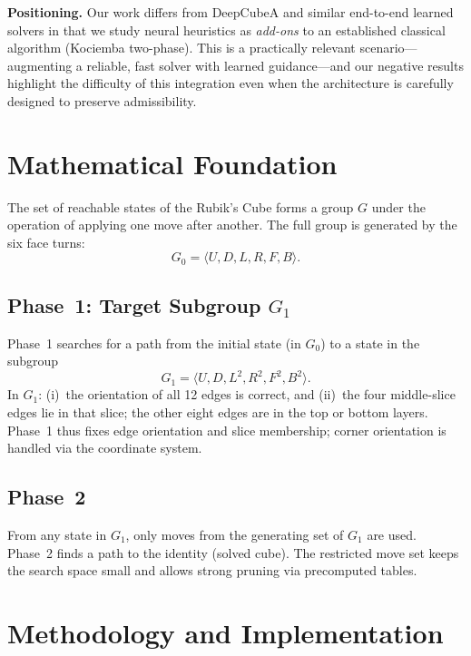 \documentclass[10pt,twocolumn,a4paper]{article}
\begin{document}
\textbf{Positioning.}
Our work differs from DeepCubeA and similar end-to-end learned solvers in that we study neural heuristics as \emph{add-ons} to an established classical algorithm (Kociemba two-phase).  This is a practically relevant scenario---augmenting a reliable, fast solver with learned guidance---and our negative results highlight the difficulty of this integration even when the architecture is carefully designed to preserve admissibility.

\section{Mathematical Foundation}
\label{sec:math}

The set of reachable states of the Rubik's Cube forms a group $G$ under the operation of applying one move after another. The full group is generated by the six face turns:
\begin{equation}
G_0 = \langle U, D, L, R, F, B \rangle.
\end{equation}

\subsection{Phase~1: Target Subgroup $G_1$}
Phase~1 searches for a path from the initial state (in $G_0$) to a state in the subgroup
\begin{equation}
G_1 = \langle U, D, L^2, R^2, F^2, B^2 \rangle.
\end{equation}
In $G_1$: (i)~the orientation of all 12 edges is correct, and (ii)~the four middle-slice edges lie in that slice; the other eight edges are in the top or bottom layers. Phase~1 thus fixes edge orientation and slice membership; corner orientation is handled via the coordinate system.

\subsection{Phase~2}
From any state in $G_1$, only moves from the generating set of $G_1$ are used. Phase~2 finds a path to the identity (solved cube). The restricted move set keeps the search space small and allows strong pruning via precomputed tables.

\section{Methodology and Implementation}
\label{sec:method}
\end{document}

